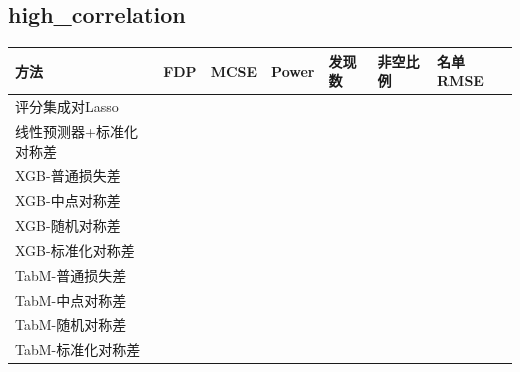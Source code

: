 \documentclass[UTF8,11pt,a4paper]{ctexart}
\begin{document}
\subsection{high\_correlation}\label{high_correlation}

{\def\LTcaptype{none} %
{
\footnotesize
\begin{longtable}[]{@{}
  >{\raggedright\arraybackslash}p{}
  >{\raggedright\arraybackslash}p{}
  >{\raggedright\arraybackslash}p{}
  >{\raggedright\arraybackslash}p{}
  >{\raggedright\arraybackslash}p{}
  >{\raggedright\arraybackslash}p{}
  >{\raggedright\arraybackslash}p{}@{}}
\toprule\noalign{}
\begin{minipage}[b]{\linewidth}\raggedright
方法
\end{minipage} & \begin{minipage}[b]{\linewidth}\raggedright
FDP
\end{minipage} & \begin{minipage}[b]{\linewidth}\raggedright
MCSE
\end{minipage} & \begin{minipage}[b]{\linewidth}\raggedright
Power
\end{minipage} & \begin{minipage}[b]{\linewidth}\raggedright
发现数
\end{minipage} & \begin{minipage}[b]{\linewidth}\raggedright
非空比例
\end{minipage} & \begin{minipage}[b]{\linewidth}\raggedright
名单RMSE
\end{minipage} \\
\midrule\noalign{}
\endhead
\bottomrule\noalign{}
\endlastfoot
评分集成对Lasso & 0.1549 & 0.0156 & 0.7730 & 9.85 & 0.89 & 0.8352 \\
线性预测器+标准化对称差 & 0.1746 & 0.0115 & 0.8590 & 10.75 & 0.95 & 0.8088 \\
XGB-普通损失差 & 0.1851 & 0.0170 & 0.7280 & 9.82 & 0.89 & 0.8412 \\
XGB-中点对称差 & 0.1712 & 0.0163 & 0.7020 & 9.34 & 0.85 & 0.8613 \\
XGB-随机对称差 & 0.1779 & 0.0171 & 0.7290 & 9.77 & 0.89 & 0.8418 \\
XGB-标准化对称差 & 0.1514 & 0.0204 & 0.3700 & 5.65 & 0.53 & 1.0223 \\
TabM-普通损失差 & 0.1662 & 0.0165 & 0.8480 & 11.01 & 0.95 & 0.8086 \\
TabM-中点对称差 & 0.1617 & 0.0163 & 0.8440 & 10.87 & 0.96 & 0.8059 \\
TabM-随机对称差 & 0.1686 & 0.0163 & 0.8510 & 11.04 & 0.97 & 0.8000 \\
TabM-标准化对称差 & 0.1772 & 0.0197 & 0.5840 & 8.46 & 0.73 & 0.9239 \\
\end{longtable}
}
}
\end{document}
